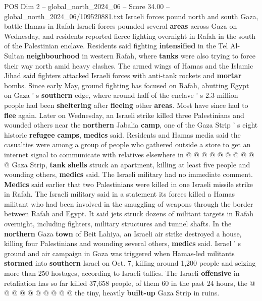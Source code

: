 \begin{textsample}{POS Dim 2 – global\_north\_2024\_06 – Score 34.00 – global\_north\_2024\_06/109520881.txt}  \label{ex:f2_pos_251}
Israeli forces pound north and south Gaza, battle Hamas in Rafah Israeli forces pounded several \textbf{areas} across Gaza on Wednesday, and residents reported fierce fighting overnight in Rafah in the south of the Palestinian enclave.
Residents said fighting \textbf{intensified} in the Tel Al-Sultan \textbf{neighbourhood} in western Rafah, where \textbf{tanks} were also trying to force their way north amid heavy clashes.
The armed wings of Hamas and the Islamic Jihad said fighters attacked Israeli forces with anti-tank rockets and \textbf{mortar} bombs.
Since early May, ground fighting has focused on Rafah, abutting Egypt on Gaza ' s \textbf{southern} edge, where around half of the enclave ' s 2.3 million people had been \textbf{sheltering} after \textbf{fleeing} other \textbf{areas}.
Most have since had to \textbf{flee} again.
Later on Wednesday, an Israeli strike killed three Palestinians and wounded others near the \textbf{northern} Jabalia \textbf{camp}, one of the Gaza Strip ' s eight historic \textbf{refugee} \textbf{camps}, \textbf{medics} said.
Residents and Hamas media said the casualties were among a group of people who gathered outside a store to get an internet signal to communicate with relatives elsewhere in @ @ @ @ @ @ @ @ @ @ Gaza Strip, \textbf{tank} \textbf{shells} struck an apartment, killing at least five people and wounding others, \textbf{medics} said.
The Israeli military had no immediate comment. \textbf{Medics} said earlier that two Palestinians were killed in one Israeli missile strike in Rafah.
The Israeli military said in a statement its forces killed a Hamas militant who had been involved in the smuggling of weapons through the border between Rafah and Egypt.
It said jets struck dozens of militant targets in Rafah overnight, including fighters, military structures and tunnel shafts.
In the \textbf{northern} Gaza \textbf{town} of Beit Lahiya, an Israeli air strike destroyed a house, killing four Palestinians and wounding several others, \textbf{medics} said.
Israel ' s ground and air campaign in Gaza was triggered when Hamas-led militants \textbf{stormed} into \textbf{southern} Israel on Oct. 7, killing around 1,200 people and seizing more than 250 hostages, according to Israeli tallies.
The Israeli \textbf{offensive} in retaliation has so far killed 37,658 people, of them 60 in the past 24 hours, the @ @ @ @ @ @ @ @ @ @ the tiny, heavily \textbf{built-up} Gaza Strip in ruins.

\end{textsample}
